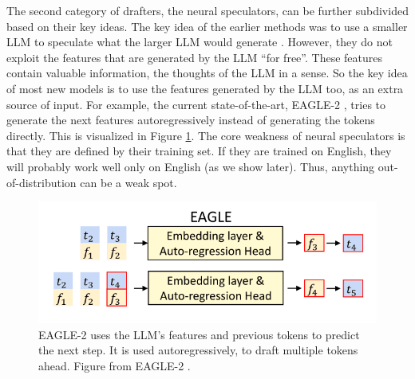 The second category of drafters, the neural speculators, can be further subdivided based on their key ideas. The key idea of the earlier methods was to use a smaller LLM to speculate what the larger LLM would generate \cite{leviathan2023fast}. However, they do not exploit the features that are generated by the LLM ``for free''. These features contain valuable information, the thoughts of the LLM in a sense. So the key idea of most new models is to use the features generated by the LLM too, as an extra source of input. For example, the current state-of-the-art, EAGLE-2 \cite{li2024eagle}, tries to generate the next features autoregressively instead of generating the tokens directly. This is visualized in Figure \ref{fig:EAGLE_model}. The core weakness of neural speculators is that they are defined by their training set. If they are trained on English, they will probably work well only on English (as we show later). Thus, anything out-of-distribution can be a weak spot.

\begin{figure}[h]
	\centering
	\includegraphics[width=0.7\linewidth]{fig/EAGLE_model.png}
	\caption{EAGLE-2 uses the LLM's \textcolor{orange-ish}{features} and previous \textcolor{blue-ish}{tokens} to predict the next step. It is used autoregressively, to draft multiple tokens ahead. Figure from EAGLE-2 \cite{li2024eagle}.}
	\label{fig:EAGLE_model}
  \end{figure}
